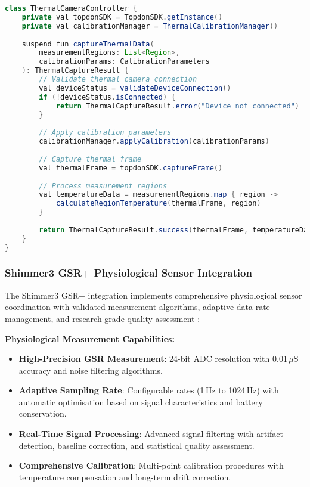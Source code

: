 \documentclass[11pt,a4paper]{report}
\begin{document}
\begin{lstlisting}[language=Java]
class ThermalCameraController {
    private val topdonSDK = TopdonSDK.getInstance()
    private val calibrationManager = ThermalCalibrationManager()
    
    suspend fun captureThermalData(
        measurementRegions: List<Region>,
        calibrationParams: CalibrationParameters
    ): ThermalCaptureResult {
        // Validate thermal camera connection
        val deviceStatus = validateDeviceConnection()
        if (!deviceStatus.isConnected) {
            return ThermalCaptureResult.error("Device not connected")
        }
        
        // Apply calibration parameters
        calibrationManager.applyCalibration(calibrationParams)
        
        // Capture thermal frame
        val thermalFrame = topdonSDK.captureFrame()
        
        // Process measurement regions
        val temperatureData = measurementRegions.map { region ->
            calculateRegionTemperature(thermalFrame, region)
        }
        
        return ThermalCaptureResult.success(thermalFrame, temperatureData)
    }
}
\end{lstlisting}

\subsubsection{Shimmer3 GSR+ Physiological Sensor Integration}

The Shimmer3 GSR+ integration implements comprehensive physiological sensor coordination with validated measurement algorithms, adaptive data rate management, and research-grade quality assessment \cite{ShimmerDoc2024}:

\textbf{Physiological Measurement Capabilities:}
\begin{itemize}
  \item \textbf{High-Precision GSR Measurement}: 24-bit ADC resolution with 0.01\,$\mu$S accuracy and noise filtering algorithms.
  \item \textbf{Adaptive Sampling Rate}: Configurable rates (1\,Hz to 1024\,Hz) with automatic optimisation based on signal characteristics and battery conservation.
  \item \textbf{Real-Time Signal Processing}: Advanced signal filtering with artifact detection, baseline correction, and statistical quality assessment.
  \item \textbf{Comprehensive Calibration}: Multi-point calibration procedures with temperature compensation and long-term drift correction.
\end{itemize}
\end{document}

